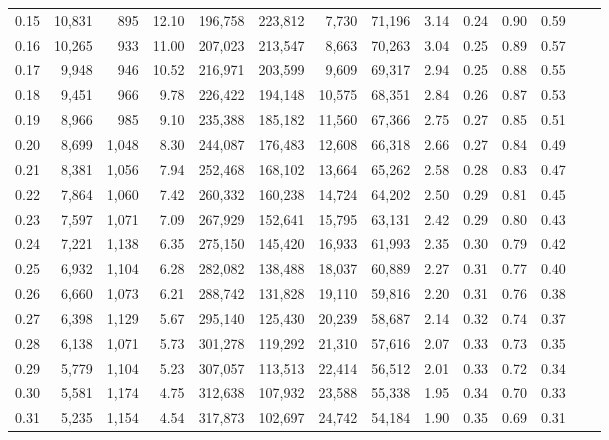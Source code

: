 \begin{tabular}{rrrrrrrrrrrrrr}
0.15 &  10,831 &    895 &   12.10 &  196,758 &  223,812 &   7,730 &  71,196 &  3.14 &  0.24 &  0.90 &      0.59 \\
0.16 &  10,265 &    933 &   11.00 &  207,023 &  213,547 &   8,663 &  70,263 &  3.04 &  0.25 &  0.89 &      0.57 \\
0.17 &   9,948 &    946 &   10.52 &  216,971 &  203,599 &   9,609 &  69,317 &  2.94 &  0.25 &  0.88 &      0.55 \\
0.18 &   9,451 &    966 &    9.78 &  226,422 &  194,148 &  10,575 &  68,351 &  2.84 &  0.26 &  0.87 &      0.53 \\
0.19 &   8,966 &    985 &    9.10 &  235,388 &  185,182 &  11,560 &  67,366 &  2.75 &  0.27 &  0.85 &      0.51 \\
0.20 &   8,699 &  1,048 &    8.30 &  244,087 &  176,483 &  12,608 &  66,318 &  2.66 &  0.27 &  0.84 &      0.49 \\
0.21 &   8,381 &  1,056 &    7.94 &  252,468 &  168,102 &  13,664 &  65,262 &  2.58 &  0.28 &  0.83 &      0.47 \\
0.22 &   7,864 &  1,060 &    7.42 &  260,332 &  160,238 &  14,724 &  64,202 &  2.50 &  0.29 &  0.81 &      0.45 \\
0.23 &   7,597 &  1,071 &    7.09 &  267,929 &  152,641 &  15,795 &  63,131 &  2.42 &  0.29 &  0.80 &      0.43 \\
0.24 &   7,221 &  1,138 &    6.35 &  275,150 &  145,420 &  16,933 &  61,993 &  2.35 &  0.30 &  0.79 &      0.42 \\
0.25 &   6,932 &  1,104 &    6.28 &  282,082 &  138,488 &  18,037 &  60,889 &  2.27 &  0.31 &  0.77 &      0.40 \\
0.26 &   6,660 &  1,073 &    6.21 &  288,742 &  131,828 &  19,110 &  59,816 &  2.20 &  0.31 &  0.76 &      0.38 \\
0.27 &   6,398 &  1,129 &    5.67 &  295,140 &  125,430 &  20,239 &  58,687 &  2.14 &  0.32 &  0.74 &      0.37 \\
0.28 &   6,138 &  1,071 &    5.73 &  301,278 &  119,292 &  21,310 &  57,616 &  2.07 &  0.33 &  0.73 &      0.35 \\
0.29 &   5,779 &  1,104 &    5.23 &  307,057 &  113,513 &  22,414 &  56,512 &  2.01 &  0.33 &  0.72 &      0.34 \\
0.30 &   5,581 &  1,174 &    4.75 &  312,638 &  107,932 &  23,588 &  55,338 &  1.95 &  0.34 &  0.70 &      0.33 \\
0.31 &   5,235 &  1,154 &    4.54 &  317,873 &  102,697 &  24,742 &  54,184 &  1.90 &  0.35 &  0.69 &      0.31 \\

\end{tabular}
